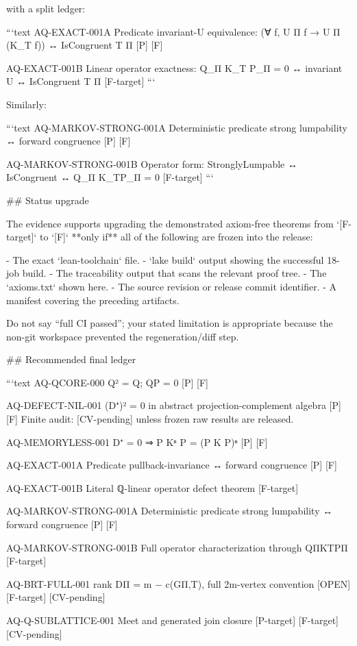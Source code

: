 with a split ledger:

```text
AQ-EXACT-001A
Predicate invariant-U equivalence:
(∀ f, U Π f → U Π (K_T f)) ↔ IsCongruent T Π
[P] [F]

AQ-EXACT-001B
Linear operator exactness:
Q_Π K_T P_Π = 0 ↔ invariant U ↔ IsCongruent T Π
[F-target]
```

Similarly:

```text
AQ-MARKOV-STRONG-001A
Deterministic predicate strong lumpability ↔ forward congruence
[P] [F]

AQ-MARKOV-STRONG-001B
Operator form:
StronglyLumpable ↔ IsCongruent ↔ Q_Π K_TP_Π = 0
[F-target]
```

## Status upgrade

The evidence supports upgrading the demonstrated axiom-free theorems from `[F-target]` to `[F]` **only if** all of the following are frozen into the release:

- The exact `lean-toolchain` file.
- `lake build` output showing the successful 18-job build.
- The traceability output that scans the relevant proof tree.
- The `axioms.txt` shown here.
- The source revision or release commit identifier.
- A manifest covering the preceding artifacts.

Do not say “full CI passed”; your stated limitation is appropriate because the non-git workspace prevented the regeneration/diff step.

## Recommended final ledger

```text
AQ-QCORE-000
Q² = Q; QP = 0
[P] [F]

AQ-DEFECT-NIL-001
(D⁺)² = 0 in abstract projection-complement algebra
[P] [F]
Finite audit: [CV-pending] unless frozen raw results are released.

AQ-MEMORYLESS-001
D⁺ = 0 ⇒ P Kⁿ P = (P K P)ⁿ
[P] [F]

AQ-EXACT-001A
Predicate pullback-invariance ↔ forward congruence
[P] [F]

AQ-EXACT-001B
Literal ℚ-linear operator defect theorem
[F-target]

AQ-MARKOV-STRONG-001A
Deterministic predicate strong lumpability ↔ forward congruence
[P] [F]

AQ-MARKOV-STRONG-001B
Full operator characterization through QΠKTPΠ
[F-target]

AQ-BRT-FULL-001
rank DΠ = m − c(GΠ,T), full 2m-vertex convention
[OPEN] [F-target] [CV-pending]

AQ-Q-SUBLATTICE-001
Meet and generated join closure
[P-target] [F-target] [CV-pending]

